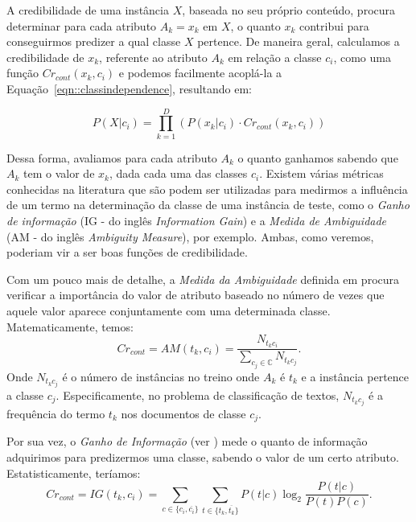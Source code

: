 A credibilidade de uma instância $X$, baseada no seu próprio conteúdo, procura determinar para cada atributo $A_k = x_k$ em $X$, o quanto $x_k$ contribui para conseguirmos predizer a qual classe $X$ pertence. De maneira geral, calculamos a credibilidade de $x_k$, referente ao atributo $A_k$ em relação a classe $c_i$, como uma função $Cr_{cont}(x_k, c_i)$ e podemos facilmente acoplá-la a Equação~\ref{eqn::classindependence}, resultando em:

\begin{equation}\label{eqn::classindependence_conteudo}
   P(X|c_{i}) = \prod^{D}_{k=1}{(P(x_k|c_i) \cdot Cr_{cont}(x_k,c_i))} 
\end{equation}

Dessa forma, avaliamos para cada atributo $A_k$ o quanto ganhamos sabendo que $A_k$ tem o valor de $x_k$, dada cada uma das classes $c_i$. Existem várias métricas conhecidas na literatura que são podem ser utilizadas para medirmos a influência de um termo na determinação da classe de uma instância de teste, como o \textit{Ganho de informação} (IG - do inglês \textit{Information Gain}) e a \textit{Medida de Ambiguidade} (AM - do inglês \textit{Ambiguity Measure}), por exemplo. Ambas, como veremos, poderiam vir a ser boas funções de credibilidade. 


    Com um pouco mais de detalhe, a \textit{Medida da Ambiguidade} definida em \cite{Mengle08} procura verificar a importância do valor de atributo baseado no número de vezes que aquele valor aparece conjuntamente com uma determinada classe. Matematicamente, temos:
\begin{equation}\label{eqn::classindependence_conteudo}
   Cr_{cont} = AM(t_k, c_i) = \frac{ N_{t_{k}c_{i}}}{\sum_{c_j \in \mathbb{C}} N_{t_{k}c_{j}}}.
\end{equation}
   Onde $N_{t_{k}c_{j}}$ é o número de instâncias no treino onde $A_k$ é $t_k$ e a instância pertence a classe $c_j$. Especificamente, no problema de classificação de textos, $N_{t_{k}c_{j}}$ é a frequência do termo $t_k$ nos documentos de classe $c_j$.

    Por sua vez, o \textit{Ganho de Informação} (ver \cite{forman03}) mede o quanto de informação adquirimos para predizermos uma classe, sabendo o valor de um certo atributo. Estatisticamente, teríamos:
\begin{equation}\label{eqn::classindependence_conteudo}
   Cr_{cont} = IG(t_k, c_i) = \sum_{c \in \{c_i, \overline{c_i}\}}\sum_{t \in \{t_k, \overline{t_k}\}}P(t|c)\log_2\frac{P(t|c)}{P(t)P(c)}.
\end{equation}

